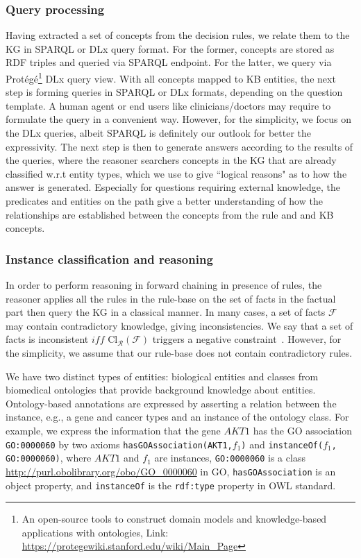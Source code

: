 \subsubsection{Query processing}
Having extracted a set of concepts from the decision rules, we relate them to the KG in SPARQL or DLx query format. For the former, concepts are stored as RDF triples and queried via SPARQL endpoint. For the latter, we query via Prot{\'e}g{\'e}\footnote{An open-source tools to construct domain models and knowledge-based applications with ontologies, Link: \url{https://protegewiki.stanford.edu/wiki/Main_Page}} DLx query view. 
With all concepts mapped to KB entities, the next step is forming queries in SPARQL or DLx formats, depending on the question template. 
A human agent or end users like clinicians/doctors may require to formulate the query in a convenient way. However, for the simplicity, we focus on the DLx queries, albeit SPARQL is definitely our outlook for better the expressivity. The next step is then to generate answers according to the results of the queries, where the reasoner searchers concepts in the KG that are already classified w.r.t entity types, which we use to give ``logical reasons" as to how the answer is generated. Especially for questions requiring external knowledge, the predicates and entities on the path give a better understanding of how the relationships are established between the concepts from the rule and and KB concepts. 

\subsubsection{Instance classification and reasoning}
In order to perform reasoning in forward chaining in presence of rules, the reasoner applies all the rules in the rule-base on the set of facts in the factual part then query the KG in a classical manner.
In many cases, a set of facts $\mathcal{F}$ may contain contradictory knowledge, giving inconsistencies. We say that a set of facts is inconsistent $iff$  $\mathrm{Cl}_{\mathcal{R}}(\mathcal{F})$ triggers a negative constraint~\cite{garoufallou2016metadata}. However, for the simplicity, we assume that our rule-base does not contain contradictory rules. 

\hspace*{3.5mm} We have two distinct types of entities: biological entities and classes from biomedical ontologies that provide background knowledge about entities. Ontology-based annotations are expressed by asserting a relation between the instance, e.g., a gene and cancer types and an instance of the ontology class. For example, we express the information that the gene $AKT1$ has the GO association \texttt{GO:0000060} by two axioms \texttt{hasGOAssociation(AKT1,$f_1$)} and \texttt{instanceOf($f_1$, GO:0000060)}, where $AKT1$ and $f_1$ are instances, \texttt{GO:0000060} is a class \url{http://purl.obolibrary.org/obo/GO\_0000060} in GO, \texttt{hasGOAssociation} is an object property, and \texttt{instanceOf} is the \texttt{rdf:type} property in OWL standard. 

